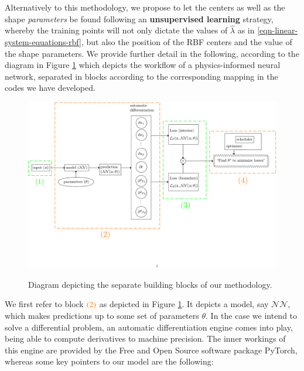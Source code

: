 \documentclass[12pt]{report} %
\newcommand{\tmcolor}[2]{{\color{#1}{#2}}}
\begin{document}

Alternatively to this methodology, we propose to let the centers as well as the shape \textit{parameters} be found following an \textbf{unsupervised learning} strategy, whereby the training points will not only dictate the values of $\hat{\lambda}$ as in \eqref{eqn-linear-system-equations-rbf}, but also the position of the RBF centers and the value of the shape parameters. We provide further detail in the following, according to the diagram in Figure \ref{fig:diagram-different-blocks-numbered} which depicts the workflow of a physics-informed neural network, separated in blocks according to the corresponding mapping in the codes we have developed.

\clearpage
\begin{figure}
{\includegraphics[width=\textwidth,clip=true,trim={0 2.5cm 0 0}]{cool_graphics/distinct_autodiffgraph.pdf}}
\caption{Diagram depicting the separate building blocks of our methodology.} 
\label{fig:diagram-different-blocks-numbered}
\end{figure}


We first refer to block $\tmcolor{orange}{(2)}$ as depicted in Figure \ref{fig:diagram-different-blocks-numbered}. It depicts a model, say $\mathcal{NN}$, which makes predictions up to some set of parameters $\theta$. In the case we intend to solve a differential problem, an automatic differentiation engine comes into play, being able to compute derivatives to machine precision. The inner workings of this engine are provided by the Free and Open Source software package PyTorch, whereas some key pointers to our model are the following:
\end{document}
